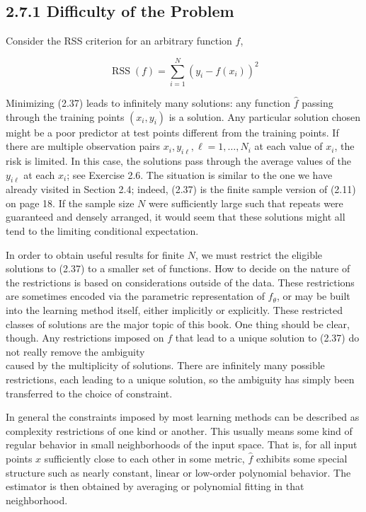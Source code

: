 \documentclass[10pt]{article}
\begin{document}
\subsection*{2.7.1 Difficulty of the Problem}
Consider the RSS criterion for an arbitrary function $f$,


\begin{equation*}
\operatorname{RSS}(f)=\sum_{i=1}^{N}\left(y_{i}-f\left(x_{i}\right)\right)^{2} \tag{2.37}
\end{equation*}


Minimizing (2.37) leads to infinitely many solutions: any function $\hat{f}$ passing through the training points $\left(x_{i}, y_{i}\right)$ is a solution. Any particular solution chosen might be a poor predictor at test points different from the training points. If there are multiple observation pairs $x_{i}, y_{i \ell}, \ell=1, \ldots, N_{i}$ at each value of $x_{i}$, the risk is limited. In this case, the solutions pass through the average values of the $y_{i \ell}$ at each $x_{i}$; see Exercise 2.6. The situation is similar to the one we have already visited in Section 2.4; indeed, (2.37) is the finite sample version of (2.11) on page 18. If the sample size $N$ were sufficiently large such that repeats were guaranteed and densely arranged, it would seem that these solutions might all tend to the limiting conditional expectation.

In order to obtain useful results for finite $N$, we must restrict the eligible solutions to (2.37) to a smaller set of functions. How to decide on the nature of the restrictions is based on considerations outside of the data. These restrictions are sometimes encoded via the parametric representation of $f_{\theta}$, or may be built into the learning method itself, either implicitly or explicitly. These restricted classes of solutions are the major topic of this book. One thing should be clear, though. Any restrictions imposed on $f$ that lead to a unique solution to (2.37) do not really remove the ambiguity\\
caused by the multiplicity of solutions. There are infinitely many possible restrictions, each leading to a unique solution, so the ambiguity has simply been transferred to the choice of constraint.

In general the constraints imposed by most learning methods can be described as complexity restrictions of one kind or another. This usually means some kind of regular behavior in small neighborhoods of the input space. That is, for all input points $x$ sufficiently close to each other in some metric, $\hat{f}$ exhibits some special structure such as nearly constant, linear or low-order polynomial behavior. The estimator is then obtained by averaging or polynomial fitting in that neighborhood.
\end{document}
